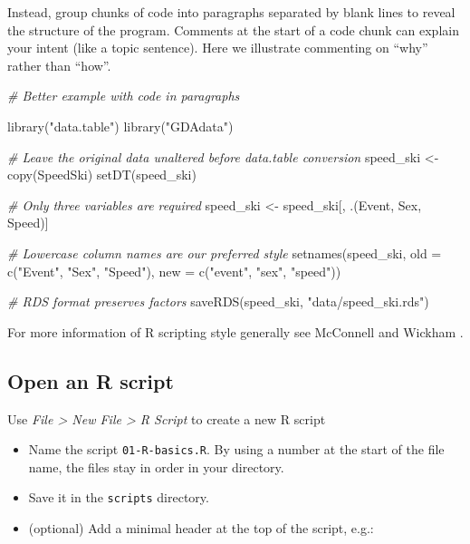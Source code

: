 \documentclass[
]{book}
\newenvironment{Shaded}{\begin{snugshade}}{\end{snugshade}}
\newcommand{\AttributeTok}[1]{\textcolor[rgb]{0.77,0.63,0.00}{#1}}
\newcommand{\CommentTok}[1]{\textcolor[rgb]{0.56,0.35,0.01}{\textit{#1}}}
\newcommand{\FunctionTok}[1]{\textcolor[rgb]{0.00,0.00,0.00}{#1}}
\newcommand{\NormalTok}[1]{#1}
\newcommand{\OtherTok}[1]{\textcolor[rgb]{0.56,0.35,0.01}{#1}}
\newcommand{\StringTok}[1]{\textcolor[rgb]{0.31,0.60,0.02}{#1}}
\providecommand{\tightlist}{%
  \setlength{\itemsep}{0pt}\setlength{\parskip}{0pt}}
\begin{document}
Instead, group chunks of code into paragraphs separated by blank lines to reveal the structure of the program. Comments at the start of a code chunk can explain your intent (like a topic sentence). Here we illustrate commenting on ``why'' rather than ``how''.

\begin{Shaded}
\begin{Highlighting}[]
\CommentTok{\# Better example with code in paragraphs}

\FunctionTok{library}\NormalTok{(}\StringTok{"data.table"}\NormalTok{)}
\FunctionTok{library}\NormalTok{(}\StringTok{"GDAdata"}\NormalTok{)}

\CommentTok{\# Leave the original data unaltered before data.table conversion }
\NormalTok{speed\_ski }\OtherTok{\textless{}{-}} \FunctionTok{copy}\NormalTok{(SpeedSki)}
\FunctionTok{setDT}\NormalTok{(speed\_ski)}

\CommentTok{\# Only three variables are required }
\NormalTok{speed\_ski }\OtherTok{\textless{}{-}}\NormalTok{ speed\_ski[, .(Event, Sex, Speed)]}

\CommentTok{\# Lowercase column names are our preferred style }
\FunctionTok{setnames}\NormalTok{(speed\_ski, }
         \AttributeTok{old =} \FunctionTok{c}\NormalTok{(}\StringTok{"Event"}\NormalTok{, }\StringTok{"Sex"}\NormalTok{, }\StringTok{"Speed"}\NormalTok{), }
         \AttributeTok{new =} \FunctionTok{c}\NormalTok{(}\StringTok{"event"}\NormalTok{, }\StringTok{"sex"}\NormalTok{, }\StringTok{"speed"}\NormalTok{))}

\CommentTok{\# RDS format preserves factors}
\FunctionTok{saveRDS}\NormalTok{(speed\_ski, }\StringTok{"data/speed\_ski.rds"}\NormalTok{)}
\end{Highlighting}
\end{Shaded}

For more information of R scripting style generally see McConnell \citeyearpar{McConnell:2004} and Wickham \citeyearpar{Wickham:2019:styleguide}.

\hypertarget{open-an-r-script}{%
\subsection{Open an R script}\label{open-an-r-script}}

Use \emph{File \textgreater{} New File \textgreater{} R Script} to create a new R script

\begin{itemize}
\tightlist
\item
  Name the script \texttt{01-R-basics.R}. By using a number at the start of the file name, the files stay in order in your directory.\\
\item
  Save it in the \texttt{scripts} directory.
\item
  (optional) Add a minimal header at the top of the script, e.g.:
\end{itemize}
\end{document}
